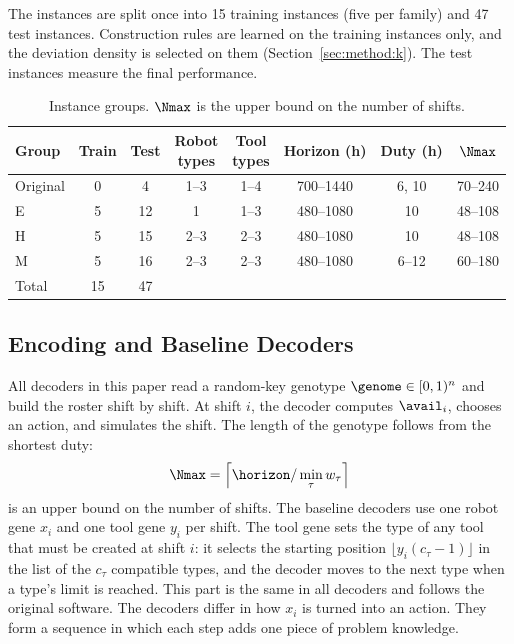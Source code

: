 The instances are split once into 15 training instances (five per family) and 47 test instances.
Construction rules are learned on the training instances only, and the deviation density is selected on them (Section~\ref{sec:method:k}).
The test instances measure the final performance.

\begin{table}[t]
  \centering
  \caption{Instance groups. $\Nmax$ is the upper bound on the number of shifts.}
  \label{tab:instances}
  \footnotesize
  \setlength{\tabcolsep}{2.5pt}
  \begin{tabular}{@{}lccccccc@{}}
    \toprule
    Group & Train & Test & \shortstack{Robot\\types} & \shortstack{Tool\\types} & Horizon (h) & Duty (h) & $\Nmax$ \\
    \midrule
    Original & 0 & 4  & 1--3 & 1--4 & 700--1440 & 6, 10 & 70--240 \\
    E        & 5 & 12 & 1    & 1--3 & 480--1080 & 10    & 48--108 \\
    H        & 5 & 15 & 2--3 & 2--3 & 480--1080 & 10    & 48--108 \\
    M        & 5 & 16 & 2--3 & 2--3 & 480--1080 & 6--12 & 60--180 \\
    \midrule
    Total    & 15 & 47 & & & & & \\
    \bottomrule
  \end{tabular}
\end{table}

\subsection{Encoding and Baseline Decoders}
\label{sec:problem:decoders}

All decoders in this paper read a random-key genotype $\genome \in [0,1)^n$ and build the roster shift by shift.
At shift $i$, the decoder computes $\avail_i$, chooses an action, and simulates the shift.
The length of the genotype follows from the shortest duty:
\begin{equation}
  \Nmax = \left\lceil \horizon / \min_\tau w_\tau \right\rceil
\end{equation}
is an upper bound on the number of shifts.
The baseline decoders use one robot gene $x_i$ and one tool gene $y_i$ per shift.
The tool gene sets the type of any tool that must be created at shift $i$:
it selects the starting position $\lfloor y_i (c_\tau - 1) \rfloor$ in the list of the $c_\tau$ compatible types,
and the decoder moves to the next type when a type's limit is reached.
This part is the same in all decoders and follows the original software.
The decoders differ in how $x_i$ is turned into an action.
They form a sequence in which each step adds one piece of problem knowledge.

